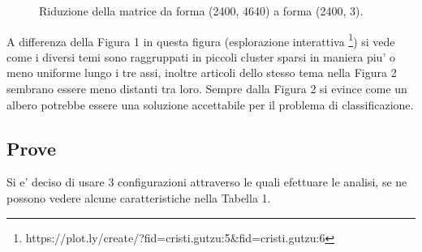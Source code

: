\documentclass[runningheads]{llncs}
\begin{document}
\begin{figure}%
    \centering
    \qquad
    \caption{Riduzione della matrice da forma (2400, 4640) a forma (2400, 3). }%
    \label{fig:tsne2}%
\end{figure}


A differenza della Figura 1 in questa figura (esplorazione interattiva
\footnote{https://plot.ly/create/?fid=cristi.gutzu:5\&fid=cristi.gutzu:6}) si vede come i diversi temi sono raggruppati in piccoli cluster sparsi in maniera piu' o meno uniforme lungo i tre assi, inoltre articoli dello stesso tema nella Figura 2 sembrano essere meno distanti tra loro. Sempre dalla Figura 2 si evince come un albero potrebbe essere una soluzione accettabile per il problema di classificazione.

\subsection{Prove}

Si e' deciso di usare 3 configurazioni attraverso le quali efettuare le analisi, se ne possono vedere alcune caratteristiche nella Tabella 1.
\end{document}
